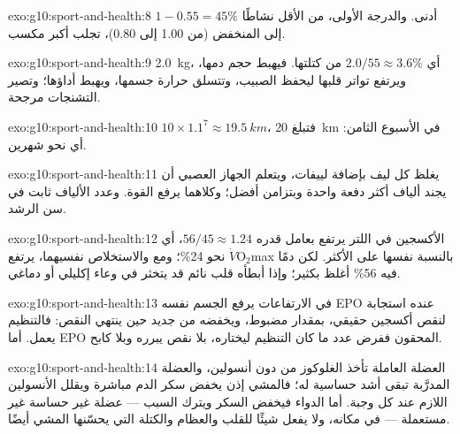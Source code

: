 \begin{solution}{exo:g10:sport-and-health:8}
$1 - 0.55 = 45\%$ أدنى. والدرجة الأولى، من الأقل نشاطًا إلى المنخفض
(من 1.00 إلى 0.80)، تجلب أكبر مكسب.
\end{solution}

\begin{solution}{exo:g10:sport-and-health:9}
\qty{2.0}{kg}، أي $2.0/55 \approx 3.6\%$ من كتلتها. فيهبط حجم دمها،
ويرتفع تواتر قلبها ليحفظ الصبيب، وتتسلق حرارة جسمها، ويهبط أداؤها؛
وتصير التشنجات مرجحة.
\end{solution}

\begin{solution}{exo:g10:sport-and-health:10}
$10 \times 1.1^7 \approx \qty{19.5}{km}$، فتبلغ \qty{20}{km} في
الأسبوع الثامن: أي نحو شهرين.
\end{solution}

\begin{solution}{exo:g10:sport-and-health:11}
يغلظ كل ليف بإضافة لييفات، ويتعلم الجهاز العصبي أن يجند ألياف أكثر
دفعة واحدة وبتزامن أفضل؛ وكلاهما يرفع القوة. وعدد الألياف ثابت في سن
الرشد.
\end{solution}

\begin{solution}{exo:g10:sport-and-health:12}
الأكسجين في اللتر يرتفع بعامل قدره $56/45 \approx 1.24$، أي نحو
24\%؛ ومع  والاستخلاص نفسيهما، يرتفع
$\dot V\!\mathrm{O_2}$max بالنسبة نفسها على الأكثر. لكن دمًا فيه 56\%  أغلظ بكثير؛ وإذا
أبطأه قلب نائم قد يتخثر في وعاء إكليلي أو دماغي.
\end{solution}

\begin{solution}{exo:g10:sport-and-health:13}
في الارتفاعات يرفع الجسم نفسه EPO عنده استجابة لنقص أكسجين حقيقي،
بمقدار مضبوط، ويخفضه من جديد حين ينتهي النقص: فالتنظيم يعمل. أما EPO
المحقون ففرض عدد ما كان التنظيم ليختاره، بلا نقص يبرره وبلا كابح.
\end{solution}

\begin{solution}{exo:g10:sport-and-health:14}
العضلة العاملة تأخذ الغلوكوز من دون أنسولين، والعضلة المدرَّبة تبقى
أشد حساسية له؛ فالمشي إذن يخفض سكر الدم مباشرة ويقلل الأنسولين اللازم
عند كل وجبة. أما الدواء فيخفض السكر ويترك السبب --- عضلة غير حساسة
غير مستعملة --- في مكانه، ولا يفعل شيئًا للقلب والعظام والكتلة التي
يحسّنها المشي أيضًا.
\end{solution}

